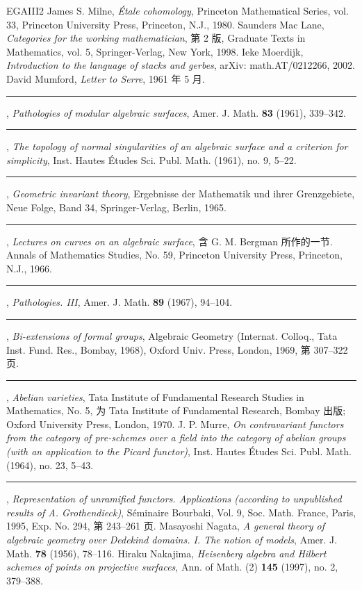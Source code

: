 \begin{thebibliography}{EGAIII2}
 James S. Milne, \emph{Étale cohomology}, Princeton Mathematical Series, vol. 33, Princeton University Press, Princeton, N.J., 1980.
 Saunders Mac Lane, \emph{Categories for the working mathematician}, 第 2 版, Graduate Texts in Mathematics, vol. 5, Springer-Verlag, New York, 1998.
 Ieke Moerdijk, \emph{Introduction to the language of stacks and gerbes}, arXiv: math.AT/0212266, 2002.
 David Mumford, \emph{Letter to Serre}, 1961 年 5 月.
 \rule{2em}{.3pt}, \emph{Pathologies of modular algebraic surfaces}, Amer. J. Math. \textbf{83} (1961), 339--342.
 \rule{2em}{.3pt}, \emph{The topology of normal singularities of an algebraic surface and a criterion for simplicity}, Inst. Hautes Études Sci. Publ. Math. (1961), no. 9, 5--22.
 \rule{2em}{.3pt}, \emph{Geometric invariant theory}, Ergebnisse der Mathematik und ihrer Grenzgebiete, Neue Folge, Band 34, Springer-Verlag, Berlin, 1965.
 \rule{2em}{.3pt}, \emph{Lectures on curves on an algebraic surface}, 含 G. M. Bergman 所作的一节. Annals of Mathematics Studies, No. 59, Princeton University Press, Princeton, N.J., 1966.
 \rule{2em}{.3pt}, \emph{Pathologies. III}, Amer. J. Math. \textbf{89} (1967), 94--104.
 \rule{2em}{.3pt}, \emph{Bi-extensions of formal groups}, Algebraic Geometry (Internat. Colloq., Tata Inst. Fund. Res., Bombay, 1968), Oxford Univ. Press, London, 1969, 第 307--322 页.
 \rule{2em}{.3pt}, \emph{Abelian varieties}, Tata Institute of Fundamental Research Studies in Mathematics, No. 5, 为 Tata Institute of Fundamental Research, Bombay 出版; Oxford University Press, London, 1970.
 J. P. Murre, \emph{On contravariant functors from the category of pre-schemes over a field into the category of abelian groups (with an application to the Picard functor)}, Inst. Hautes Études Sci. Publ. Math. (1964), no. 23, 5--43.
 \rule{2em}{.3pt}, \emph{Representation of unramified functors. Applications (according to unpublished results of A. Grothendieck)}, Séminaire Bourbaki, Vol. 9, Soc. Math. France, Paris, 1995, Exp. No. 294, 第 243--261 页.
 Masayoshi Nagata, \emph{A general theory of algebraic geometry over Dedekind domains. I. The notion of models}, Amer. J. Math. \textbf{78} (1956), 78--116.
 Hiraku Nakajima, \emph{Heisenberg algebra and Hilbert schemes of points on projective surfaces}, Ann. of Math. (2) \textbf{145} (1997), no. 2, 379--388.

\end{thebibliography}
